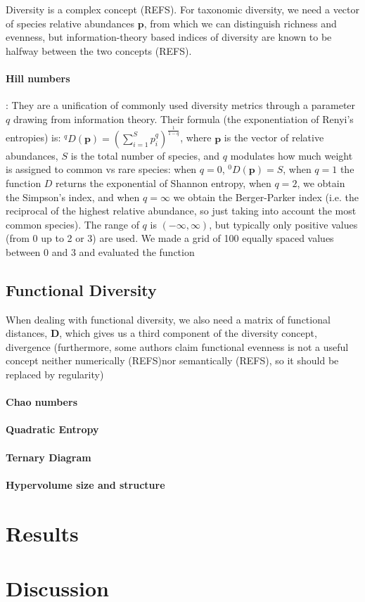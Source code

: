 \documentclass[a4paper, 9pt]{article}
\newcommand{\refs}{(\alert{REFS})}
\begin{document}
	Diversity is a complex concept \refs. For taxonomic diversity, we need a vector of species relative abundances $\mathbf{p}$, from which we can distinguish richness and evenness, but information-theory based indices of diversity are known to be halfway between the two concepts \refs.
	
	\paragraph*{Hill numbers}: They are a unification of commonly used diversity metrics through a parameter $q$ drawing from information theory. Their formula (the exponentiation of Renyi's entropies) is:
	$^qD(\mathbf{p}) = \left(\sum_{i = 1}^{S} p_i^q\right)^{\frac 1 {1-q}}$, where $\mathbf{p}$ is the vector of relative abundances, $S$ is the total number of species, and $q$ modulates how much weight is assigned to common vs rare species: when $q=0$, $^0D(\mathbf{p}) = S$, when $q = 1$ the function $D$ returns the exponential of Shannon entropy, when $q = 2$, we obtain the Simpson's index, and when $q = \infty$ we obtain the Berger-Parker index (i.e. the reciprocal of the highest relative abundance, so just taking into account the most common species). The range of $q$ is $(-\infty, \infty)$, but typically only positive values (from 0 up to 2 or 3) are used. We made a grid of 100 equally spaced values between 0 and 3 and evaluated the function 
	
	\subsection*{Functional Diversity}
	
	When dealing with functional diversity, we also need a matrix of functional distances, $\mathbf{D}$, which gives us a third component of the diversity concept, divergence (furthermore, some authors claim functional evenness is not a useful concept neither numerically \refs nor semantically \refs, so it should be replaced by regularity)
	
	\paragraph*{Chao numbers}
	
	\paragraph*{Quadratic Entropy}
	
	\paragraph*{Ternary Diagram}
	
	\paragraph*{Hypervolume size and structure}
	
	\section*{Results}
	\label{sec:res}
	
	\section*{Discussion}
	\label{sec:disc}
\end{document}
